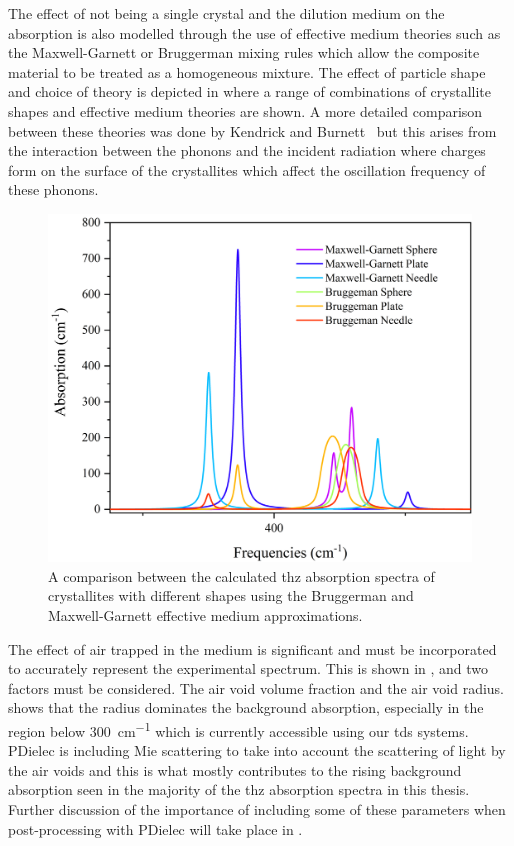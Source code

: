 The effect of not being a single crystal and the dilution medium on the absorption is also modelled through the use of effective medium theories such as the Maxwell\nobreakdash-Garnett or Bruggerman mixing rules which allow the composite material to be treated as a homogeneous mixture. The effect of particle shape and choice of theory is depicted in  where a range of combinations of crystallite shapes and effective medium theories are shown. A more detailed comparison between these theories was done by Kendrick and Burnett~\cite{Kendrick2020} but this arises from the interaction between the phonons and the incident radiation where charges form on the surface of the crystallites which affect the oscillation frequency of these phonons. 

\begin{figure}
    \centering
    \includegraphics[scale=0.6]{Figures/Misc/Theory/ZnOMRG.png}
    \captionsetup{font = footnotesize, justification = centering}
    \caption[A Comparison between Crystallites of Different Shapes using the Bruggerman and Maxwell-Garnett Effective Medium Approximations]{A comparison between the calculated \acrshort{thz} absorption spectra of crystallites with different shapes using the Bruggerman and Maxwell-Garnett effective medium approximations.}
    \label{fig:EMAsShapes}
\end{figure}

The effect of air trapped in the medium is significant and must be incorporated to accurately represent the experimental spectrum. This is shown in , and two factors must be considered. The air void volume fraction and the air void radius.  shows that the radius dominates the background absorption, especially in the region below \SI{300}{cm^{-1}} which is currently accessible using our \acrshort{tds} systems. PDielec is including Mie scattering to take into account the scattering of light by the air voids and this is what mostly contributes to the rising background absorption seen in the majority of the \acrshort{thz} absorption spectra in this thesis. Further discussion of the importance of including some of these parameters when post\nobreakdash-processing with PDielec will take place in .

